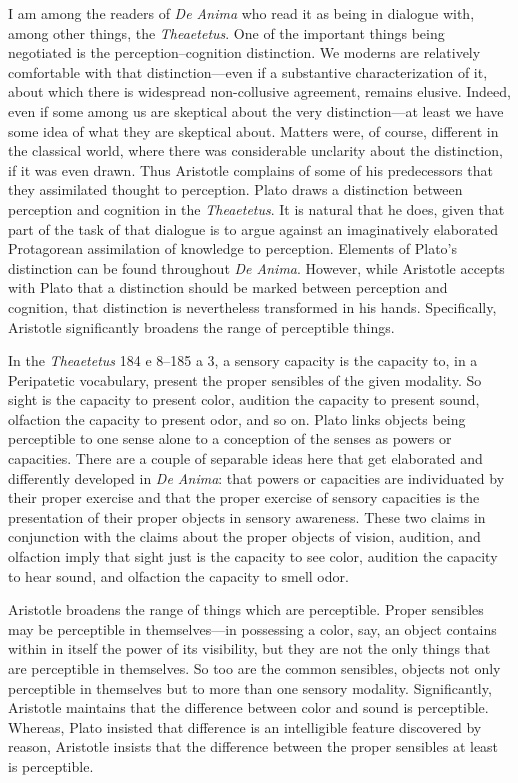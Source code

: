 \documentclass[12pt]{article}
\begin{document}
I am among the readers of \emph{De Anima} who read it as being in dialogue with, among other things, the \emph{Theaetetus}. One of the important things being negotiated is the perception--cognition distinction. We moderns are relatively comfortable with that distinction---even if a substantive characterization of it, about which there is widespread non-collusive agreement, remains elusive. Indeed, even if some among us are skeptical about the very distinction---at least we have some idea of what they are skeptical about. Matters were, of course, different in the classical world, where there was considerable unclarity about the distinction, if it was even drawn. Thus Aristotle complains of some of his predecessors that they assimilated thought to perception. Plato draws a distinction between perception and cognition in the \emph{Theaetetus}. It is natural that he does, given that part of the task of that dialogue is to argue against an imaginatively elaborated Protagorean assimilation of knowledge to perception. Elements of Plato's distinction can be found throughout \emph{De Anima}. However, while Aristotle accepts with Plato that a distinction should be marked between perception and cognition, that distinction is nevertheless transformed in his hands. Specifically, Aristotle significantly broadens the range of perceptible things.

In the \emph{Theaetetus} 184 e 8--185 a 3, a sensory capacity is the capacity to, in a Peripatetic vocabulary, present the proper sensibles of the given modality. So sight is the capacity to present color, audition the capacity to present sound, olfaction the capacity to present odor, and so on. Plato links objects being perceptible to one sense alone to a conception of the senses as powers or capacities. There are a couple of separable ideas here that get elaborated and differently developed in \emph{De Anima}: that powers or capacities are individuated by their proper exercise and that the proper exercise of sensory capacities is the presentation of their proper objects in sensory awareness. These two claims in conjunction with the claims about the proper objects of vision, audition, and olfaction imply that sight just is the capacity to see color, audition the capacity to hear sound, and olfaction the capacity to smell odor. 

Aristotle broadens the range of things which are perceptible. Proper sensibles may be perceptible in themselves---in possessing a color, say, an object contains within in itself the power of its visibility, but they are not the only things that are perceptible in themselves. So too are the common sensibles, objects not only perceptible in themselves but to more than one sensory modality. Significantly, Aristotle maintains that the difference between color and sound is perceptible. Whereas, Plato insisted that difference is an intelligible feature discovered by reason, Aristotle insists that the difference between the proper sensibles at least is perceptible.
\end{document}
